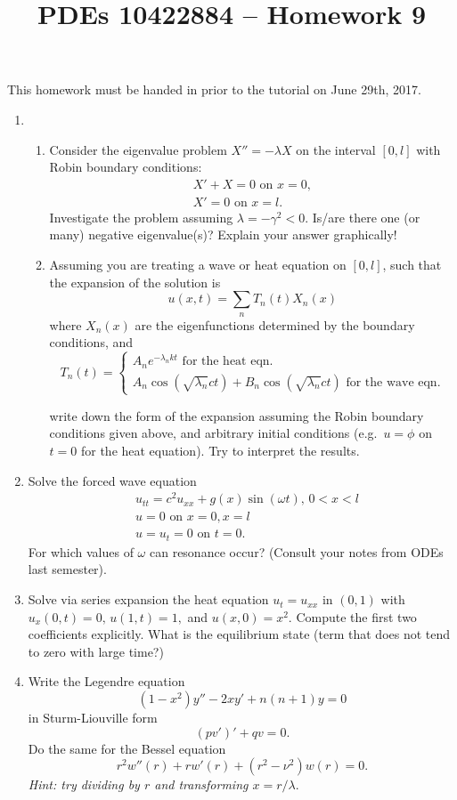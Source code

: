 \documentclass[10pt,a4paper]{article}
\title{PDEs 10422884 – Homework 9}
\date{}
\begin{document}
\maketitle


This homework must be handed in prior to the tutorial on June 29th,
2017. 
\begin{enumerate}
\item \begin{enumerate} %
\item Consider the eigenvalue problem $X'' = - \lambda X$ on the interval $[0,l]$ with Robin boundary conditions: 
\begin{align*}
X' + X = 0 \text{ on } x = 0,\\
X' = 0 \text{ on } x = l.
\end{align*}
Investigate the problem assuming $\lambda = - \gamma^2 < 0.$ Is/are there one (or many) negative eigenvalue(s)? Explain your answer graphically!
\item Assuming you are treating a wave or heat equation on $[0,l]$, such that the expansion of the solution is 
\begin{equation}
u(x,t) = \sum_n T_n(t) X_n(x) 
\end{equation}
where $X_n(x)$ are the eigenfunctions determined by the boundary conditions, and 
\[ T_n(t) = \begin{cases} A_n e^{-\lambda_n k t} \text{ for the heat eqn.} \\
A_n \cos(\sqrt{\lambda_n}ct) + B_n \cos(\sqrt{\lambda_n}ct) \text{ for the wave eqn.} \end{cases} \]

write down the form of the expansion assuming the Robin boundary conditions given above, and arbitrary initial conditions (e.g.\ $u = \phi$ on $t = 0$ for the heat equation). Try to interpret the results.
\end{enumerate}
\item Solve the forced wave equation %
\begin{align*}
& u_{tt} = c^2 u_{xx} + g(x) \sin(\omega t), \, 0 < x < l \\
& u = 0 \text{ on } x = 0, x = l \\
& u = u_t = 0 \text{ on } t = 0.
\end{align*}
For which values of $\omega$ can resonance occur? (Consult your notes from ODEs last semester).
\item Solve via series expansion the heat equation $u_t = u_{xx}$ in $(0,1)$ with $u_x(0,t) = 0, \, u(1,t) = 1,$ and $u(x,0) = x^2.$ Compute the first two coefficients explicitly. What is the equilibrium state (term that does not tend to zero with large time?) %
\item Write the Legendre equation  %
\[ (1-x^2) y'' - 2 xy' + n(n+1)y = 0 \]
in Sturm-Liouville form 
\[ (pv')' + q v   = 0 .\]
Do the same for the Bessel equation
\[ r^2 w''(r) + r w'(r) + (r^2 - \nu^2) w(r) = 0.\]
\emph{Hint: try dividing by $r$ and transforming $x = r/\lambda.$}


\end{enumerate}
\end{document}
